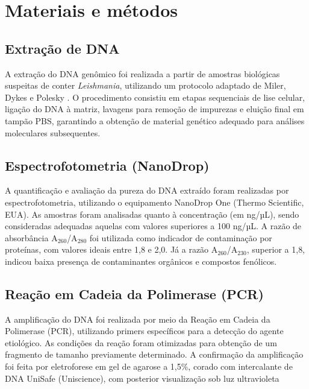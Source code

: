 \section{Materiais e métodos}

\subsection{Extração de DNA}

A extração do DNA genômico foi realizada a partir de amostras biológicas suspeitas de conter 
\textit{Leishmania}, utilizando um protocolo adaptado de Miler, Dykes e Polesky \cite{miller1988salting}. 
O procedimento consistiu em etapas sequenciais de lise celular, ligação do DNA à matriz, lavagens para remoção 
de impurezas e eluição final em tampão PBS, garantindo a obtenção de material genético adequado para análises 
moleculares subsequentes.

\subsection{Espectrofotometria (NanoDrop)}

A quantificação e avaliação da pureza do DNA extraído foram realizadas por espectrofotometria, utilizando o 
equipamento NanoDrop One (Thermo Scientific, EUA). As amostras foram analisadas quanto à concentração (em ng/µL), 
sendo consideradas adequadas aquelas com valores superiores a 100 ng/µL. A razão de absorbância A$_{260}$/A$_{280}$ 
foi utilizada como indicador de contaminação por proteínas, com valores ideais entre 1{,}8 e 2{,}0. Já a razão 
A$_{260}$/A$_{230}$, superior a 1{,}8, indicou baixa presença de contaminantes orgânicos e compostos fenólicos.

\subsection{Reação em Cadeia da Polimerase (PCR)}

A amplificação do DNA foi realizada por meio da Reação em Cadeia da Polimerase (PCR), utilizando primers específicos 
para a detecção do agente etiológico. As condições da reação foram otimizadas para obtenção de um fragmento de tamanho 
previamente determinado. A confirmação da amplificação foi feita por eletroforese em gel de agarose a 1,5\%, corado com 
intercalante de DNA UniSafe (Uniscience), com posterior visualização sob luz ultravioleta

